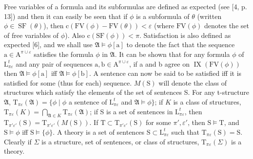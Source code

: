 \documentclass{article}
\begin{document}
{{Free variables of a formula and its subformulas are defined as expected (see [4, p. 13]) and then it can easily be seen that if $\phi$ is a subformula of $\theta$ (written $\phi \in \operatorname{SF}(\theta)$), then $\mathrm{c}(\mathrm{FV}(\phi)-\mathrm{FV}(\theta))<\varepsilon$ (where $\mathrm{FV}(\phi)$ denotes the set of free variables of $\phi$). Also $\mathrm{c}(\mathrm{SF}(\phi))<\pi$. Satisfaction is also defined as expected [6], and we shall use $\mathfrak{A} \vDash \phi[\mathrm{a}]$ to denote the fact that the sequence $\mathrm{a} \in \mathrm{A}^{\pi \cup \varepsilon}$ satisfies the formula $\phi$ in $\mathfrak{A}$. It can be shown that for any formula $\phi$ of $\mathrm{L}_{\pi \varepsilon}^{t}$ and any pair of sequences $\mathrm{a}, \mathrm{b} \in \mathrm{A}^{\pi \cup \varepsilon}$, if a and b agree on $\operatorname{IX}(\mathrm{FV}(\phi))$ then $\mathfrak{A} \vDash \phi[\mathrm{a}]$ iff $\mathfrak{A} \vDash \phi[\mathrm{b}]$. A sentence can now be said to be satisfied iff it is satisfied for some (thus for each) sequence.
$M(\mathrm{S})$ will denote the class of structures which satisfy the elements of the set of sentences S. For any t-structure $\mathfrak{A}$, $\mathrm{T}_{\pi \varepsilon}(\mathfrak{A})=\{\phi \mid \phi$ a sentence of $\mathrm{L}_{\pi \varepsilon}^{t}$ and $\mathfrak{A} \vDash \phi\}$; if $K$ is a class of structures, $\mathrm{T}_{\pi \varepsilon}(K)=\bigcap_{\mathfrak{A} \in K} \mathrm{T}_{\pi \varepsilon}(\mathfrak{A})$; if S is a set of sentences in $\mathrm{L}_{\pi \varepsilon}^{t}$, then $\mathrm{T}_{\pi' \varepsilon'}(\mathrm{S})=\mathrm{T}_{\pi' \varepsilon'}(M(\mathrm{S}))$. If $\mathrm{T} \subset \mathrm{T}_{\pi' \varepsilon'}(\mathrm{S})$ for some $\pi', \varepsilon'$, then $\mathrm{S} \vDash \mathrm{T}$, and $\mathrm{S} \vDash \phi$ iff $\mathrm{S} \vDash \{\phi\}$. A theory is a set of sentences $\mathrm{S} \subset \mathrm{L}_{\pi \varepsilon}^{t}$ such that $\mathrm{T}_{\pi \varepsilon}(\mathrm{S})=\mathrm{S}$. Clearly if $\Sigma$ is a structure, set of sentences, or class of structures, $\mathrm{T}_{\pi \varepsilon}(\Sigma)$ is a theory.
}}
\end{document}
